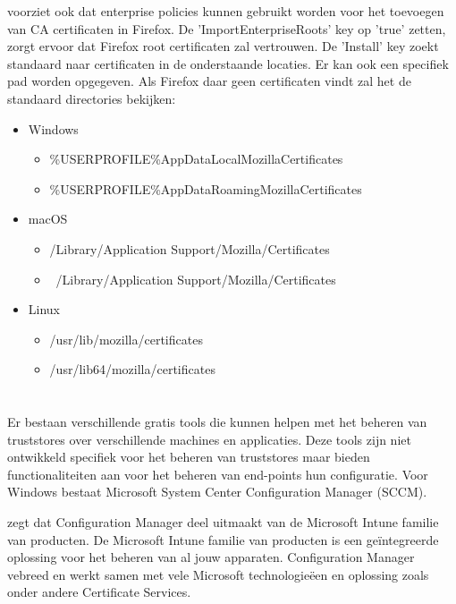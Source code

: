 \textcite{MozillaCA} voorziet ook dat enterprise policies kunnen gebruikt worden voor het toevoegen van CA certificaten in Firefox.
De 'ImportEnterpriseRoots' key op 'true' zetten, zorgt ervoor dat Firefox root certificaten zal vertrouwen.
De 'Install' key zoekt standaard naar certificaten in de onderstaande locaties. Er kan ook een specifiek pad worden opgegeven. Als Firefox daar geen certificaten vindt zal het de standaard directories bekijken:
\begin{itemize}
  \item Windows
  \begin{itemize}
    \item \%USERPROFILE\%AppDataLocalMozillaCertificates 
    \item \%USERPROFILE\%AppDataRoamingMozillaCertificates
  \end{itemize}

  \item macOS
  \begin{itemize}
    \item /Library/Application Support/Mozilla/Certificates 
    \item ~/Library/Application Support/Mozilla/Certificates 
  \end{itemize}

  \item Linux 
  \begin{itemize}
    \item /usr/lib/mozilla/certificates 
    \item /usr/lib64/mozilla/certificates 
  \end{itemize}
\end{itemize} \autocite{MozillaCA} \break

\section{}%
\label{sec:Bestaande tools}

Er bestaan verschillende gratis tools die kunnen helpen met het beheren van truststores over verschillende machines en applicaties.
Deze tools zijn niet ontwikkeld specifiek voor het beheren van truststores maar bieden functionaliteiten aan voor het beheren van end-points hun configuratie.
Voor Windows bestaat Microsoft System Center Configuration Manager (SCCM).

\textcite{ConfigMan} zegt dat Configuration Manager deel uitmaakt van de Microsoft Intune familie van producten. De Microsoft Intune familie van producten is een geïntegreerde oplossing voor het beheren van al jouw apparaten.
Configuration Manager vebreed en werkt samen met vele Microsoft technologieëen en oplossing zoals onder andere Certificate Services.

